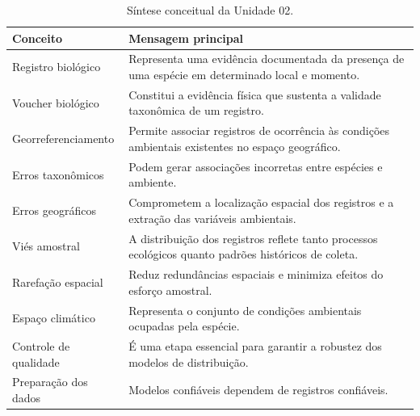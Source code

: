 \begin{table}[H]
	\centering
	\caption{Síntese conceitual da Unidade 02.}
	\label{tab:sintese_unidade02}
	\begin{tabular}{p{4cm}p{10cm}}
		\toprule
		\textbf{Conceito} &
		\textbf{Mensagem principal} \\
		\midrule
		
		Registro biológico
		&
		Representa uma evidência documentada da presença de uma espécie em determinado local e momento.
		
		\\
		
		Voucher biológico
		&
		Constitui a evidência física que sustenta a validade taxonômica de um registro.
		
		\\
		
		Georreferenciamento
		&
		Permite associar registros de ocorrência às condições ambientais existentes no espaço geográfico.
		
		\\
		
		Erros taxonômicos
		&
		Podem gerar associações incorretas entre espécies e ambiente.
		
		\\
		
		Erros geográficos
		&
		Comprometem a localização espacial dos registros e a extração das variáveis ambientais.
		
		\\
		
		Viés amostral
		&
		A distribuição dos registros reflete tanto processos ecológicos quanto padrões históricos de coleta.
		
		\\
		
		Rarefação espacial
		&
		Reduz redundâncias espaciais e minimiza efeitos do esforço amostral.
		
		\\
		
		Espaço climático
		&
		Representa o conjunto de condições ambientais ocupadas pela espécie.
		
		\\
		
		Controle de qualidade
		&
		É uma etapa essencial para garantir a robustez dos modelos de distribuição.
		
		\\
		
		Preparação dos dados
		&
		Modelos confiáveis dependem de registros confiáveis.
		
		\\
		
		\bottomrule
	\end{tabular}
\end{table}
